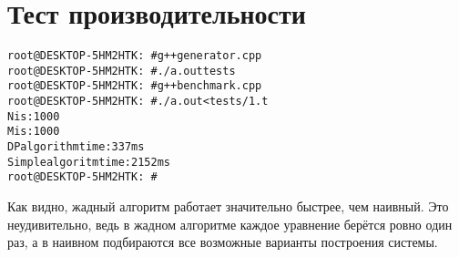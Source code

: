 \section{Тест производительности}

\begin{alltt}
root@DESKTOP-5HM2HTK:~# g++ generator.cpp
root@DESKTOP-5HM2HTK:~# ./a.out tests
root@DESKTOP-5HM2HTK:~# g++ benchmark.cpp
root@DESKTOP-5HM2HTK:~# ./a.out <tests/1.t
N is: 1000
M is: 1000
DP algorithm time: 337ms
Simple algoritm time: 2152ms
root@DESKTOP-5HM2HTK:~#
\end{alltt}

Как видно, жадный алгоритм работает значительно быстрее, чем наивный. Это неудивительно, ведь в жадном алгоритме каждое уравнение берётся ровно один раз, а в наивном подбираются все возможные варианты построения системы.

\pagebreak


